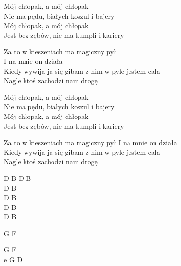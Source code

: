 \begin{text}
    \chordfill
    Mój chłopak, a mój chłopak\\
    Nie ma pędu, białych koszul i bajery\\
    Mój chłopak, a mój chłopak\\
    Jest bez zębów, nie ma kumpli i kariery

    Za to w kieszeniach ma magiczny pył\\
    I na mnie on działa\\
    Kiedy wywija ja się gibam z nim w pyle jestem cała\\
    Nagle ktoś zachodzi nam drogę

    Mój chłopak, a mój chłopak\\
    Nie ma pędu, białych koszul i bajery\\
    Mój chłopak, a mój chłopak\\
    Jest bez zębów, nie ma kumpli i kariery

    Za to w kieszeniach ma magiczny pył I na mnie on działa\\
    Kiedy wywija ja się gibam z nim w pyle jestem cała\\
    Nagle ktoś zachodzi nam drogę
\end{text}
\begin{chord}
    D B D B\\
    D B\\
    D B\\
    D B\\
    D B

    G F

    G F\\
    e G D
\end{chord}
